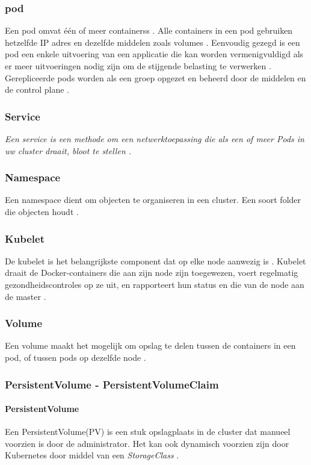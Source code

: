 \subsubsection{pod}
Een pod omvat één of meer containerss \autocite{habbal-2020}.
Alle containers in een pod gebruiken hetzelfde IP adres en dezelfde middelen zoals volumes \autocite{hohn-2020}.
Eenvoudig gezegd is een pod een enkele uitvoering van een applicatie die kan worden vermenigvuldigd als er meer uitvoeringen nodig zijn om de stijgende belasting te verwerken \autocite{habbal-2020}.
Gerepliceerde pods worden als een groep opgezet en beheerd door de middelen en de control plane \textcite{KubernetesDocs-2023}.

\subsubsection{Service}
\textit{Een service is een methode om een netwerktoepassing die als een of meer Pods in uw cluster draait, bloot te stellen \autocite{KubernetesDocs-2023}.}

\subsubsection{Namespace}
Een namespace dient om objecten te organiseren in een cluster.
Een soort folder die objecten houdt \autocite{burns-2022}.

\subsubsection{Kubelet}
De kubelet is het belangrijkste component dat op elke node aanwezig is \autocite{Vayghan2019}.
Kubelet draait de Docker-containers die aan zijn node zijn toegewezen, voert regelmatig gezondheidscontroles op ze uit, en rapporteert hun status en die van de node aan de master \autocite{Vayghan2019}.

\subsubsection{Volume}
Een volume maakt het mogelijk om opslag te delen tussen de containers in een pod, of tussen pods op dezelfde node \autocite{Baier2017}.

\subsubsection{PersistentVolume - PersistentVolumeClaim}
\paragraph{PersistentVolume}
Een PersistentVolume(PV) is een stuk opslagplaats in de cluster dat manueel voorzien is door de administrator. Het kan ook dynamisch voorzien zijn door Kubernetes door middel van een \textit{StorageClass} \autocite{KubernetesDocs-2023}.

